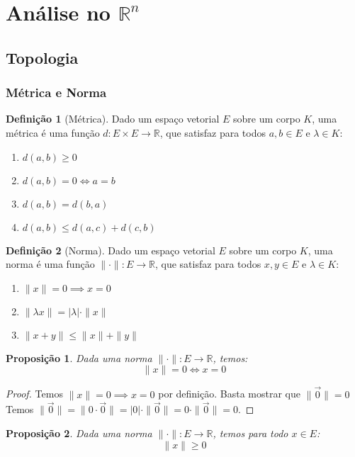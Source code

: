 \documentclass{article}
\theoremstyle{plain}
\newtheorem{prop}{Proposição}[section]
\theoremstyle{definition}
\newtheorem{definicao}{Definição}[section]
\theoremstyle{remark}
\begin{document}
\section{Análise no $\mathbb{R}^n$}
\subsection{Topologia}
\subsubsection{Métrica e Norma}
\begin{definicao}[Métrica]
	Dado um espaço vetorial $E$ sobre um corpo $K$, uma métrica é uma função $d: E\times E \to \mathbb{R}$, que satisfaz para todos $a,b\in E$ e $\lambda \in K$:
	\begin{enumerate}
		\item $d(a,b) \geq 0$
		\item $d(a,b) = 0 \iff a = b $
		\item $d(a,b) = d(b,a)$
		\item $ d(a,b) \leq d(a,c) + d(c,b)$
	\end{enumerate}
\end{definicao}
\begin{definicao}[Norma]
	Dado um espaço vetorial $E$ sobre um corpo $K$, uma norma é uma função $\| \cdot \|: E \to \mathbb{R}$, que satisfaz para todos $x,y\in E$ e $\lambda \in K$:

	\begin{enumerate}
		\item $\| x \| = 0 \implies x = 0 $
		\item $\| \lambda x \| = | \lambda | \cdot \| x \|$
		\item $ \| x+y \| \leq \| x \| + \| y \|$
	\end{enumerate}
\end{definicao}
\begin{prop}
	Dada uma norma $\| \cdot \|: E \to \mathbb{R}$, temos:
	$$ \| x\| = 0 \iff x = 0 $$
\end{prop}
\begin{proof}
	Temos $\| x \| =0 \implies x = 0$ por definição. Basta mostrar que $\| \vec{0} \| = 0 $
	Temos $\| \vec{0} \| = \| 0 \cdot \vec{0} \|  = |0| \cdot \| \vec{0} \| = 0 \cdot \|\vec{0} \| = 0$.
\end{proof}
\begin{prop}
	Dada uma norma $\| \cdot \|: E \to \mathbb{R}$, temos para todo $x\in E$:
	$$ \|x \| \geq 0 $$
\end{prop}
\end{document}
